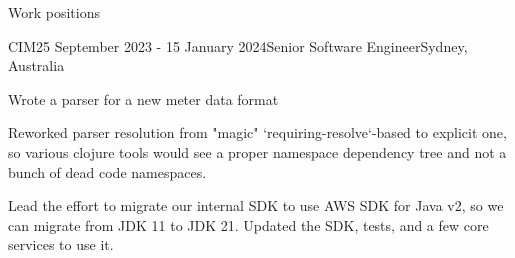 \documentclass{resume} %
\begin{document}

\begin{rSection}{Work positions}

\begin{rSubsection}{CIM}{25 September 2023 - 15 January 2024}{Senior Software Engineer}{Sydney, Australia} %
\item Wrote a parser for a new meter data format
\item Reworked parser resolution from "magic" `requiring-resolve`-based to explicit one, so various clojure
    tools would see a proper namespace dependency tree and not a bunch of dead code namespaces.
\item Lead the effort to migrate our internal SDK to use AWS SDK for Java v2, so we can migrate from JDK 11 to JDK 21.
    Updated the SDK, tests, and a few core services to use it.
~
\end{rSubsection}


\end{rSection}
\end{document}
